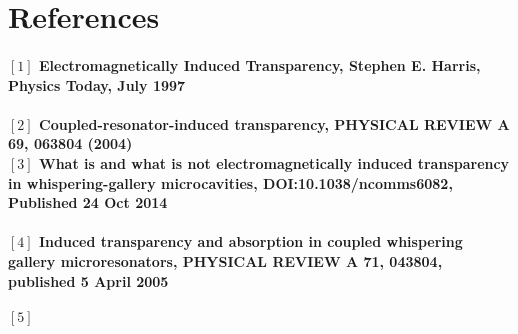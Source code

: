 \newpage
\section*{References}

\paragraph{\normalfont \large $[1]$ Electromagnetically Induced Transparency, Stephen E. Harris, Physics Today, July 1997 \\ 
\\$[2]$ Coupled-resonator-induced transparency, PHYSICAL REVIEW A 69, 063804 (2004)
\\$[3]$ What is and what is not electromagnetically induced transparency in whispering-gallery microcavities, DOI:10.1038/ncomms6082, Published 24 Oct 2014 \\
\\$[4]$  Induced transparency and absorption in coupled whispering gallery microresonators, PHYSICAL REVIEW A 71, 043804, published 5 April 2005\\
\\$[5]$  }